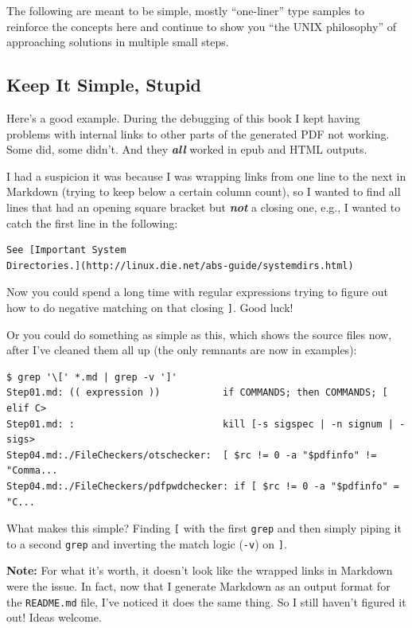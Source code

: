 \documentclass[10pt,]{book}
\numberwithin{figure}{chapter}
\begin{document}
The following are meant to be simple, mostly ``one-liner'' type samples
to reinforce the concepts here and continue to show you ``the UNIX
philosophy'' of approaching solutions in multiple small steps.

\subsection{Keep It Simple, Stupid}\label{keep-it-simple-stupid}

Here's a good example. During the debugging of this book I kept having
problems with internal links to other parts of the generated PDF not
working. Some did, some didn't. And they \textbf{\emph{all}} worked in
epub and HTML outputs.

I had a suspicion it was because I was wrapping links from one line to
the next in Markdown (trying to keep below a certain column count), so I
wanted to find all lines that had an opening square bracket but
\textbf{\emph{not}} a closing one, e.g., I wanted to catch the first
line in the following:

\begin{verbatim}
See [Important System
Directories.](http://linux.die.net/abs-guide/systemdirs.html)
\end{verbatim}

Now you could spend a long time with regular expressions trying to
figure out how to do negative matching on that closing \texttt{{]}}.
Good luck!

Or you could do something as simple as this, which shows the source
files now, after I've cleaned them all up (the only remnants are now in
examples):

\begin{verbatim}
$ grep '\[' *.md | grep -v ']'
Step01.md: (( expression ))           if COMMANDS; then COMMANDS; [ elif C>
Step01.md: :                          kill [-s sigspec | -n signum | -sigs>
Step04.md:./FileCheckers/otschecker:  [ $rc != 0 -a "$pdfinfo" != "Comma...
Step04.md:./FileCheckers/pdfpwdchecker: if [ $rc != 0 -a "$pdfinfo" = "C...
\end{verbatim}

What makes this simple? Finding \texttt{{[}} with the first
\texttt{grep} and then simply piping it to a second \texttt{grep} and
inverting the match logic (\texttt{-v}) on \texttt{{]}}.

\textbf{Note:} For what it's worth, it doesn't look like the wrapped
links in Markdown were the issue. In fact, now that I generate Markdown
as an output format for the \texttt{README.md} file, I've noticed it
does the same thing. So I still haven't figured it out! Ideas welcome.
\end{document}
